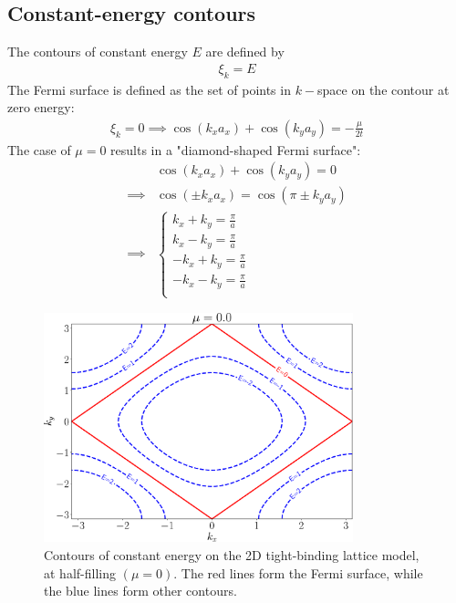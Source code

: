 \documentclass[12pt]{article}
\numberwithin{equation}{section}
\begin{document}
\subsection*{Constant-energy contours}
The contours of constant energy \(E\) are defined by
\begin{equation}\begin{aligned}
	\xi_k = E
\end{aligned}\end{equation}
The Fermi surface is defined as the set of points in $k-$space on the contour at zero energy:
\begin{equation}\begin{aligned}
	\xi_k = 0 \implies \cos(k_x a_x) + \cos(k_y a_y) = -\frac{\mu}{2t}
\end{aligned}\end{equation}
The case of \(\mu=0\) results in a "diamond-shaped Fermi surface":
\begin{equation}\begin{aligned}
	&\cos(k_x a_x) + \cos(k_y a_y) = 0\\
	\implies &\cos(\pm k_x a_x) = \cos(\pi \pm k_y a_y) \\
	\implies & \begin{cases}
		k_x + k_y = \frac{\pi}{a}\\
		k_x - k_y = \frac{\pi}{a}\\
		-k_x + k_y = \frac{\pi}{a}\\
		-k_x - k_y = \frac{\pi}{a}\\
	\end{cases}
\end{aligned}\end{equation}
\begin{figure}[htpb]
	\centering
	\includegraphics[width=0.8\textwidth]{./contours.pdf}
	\caption{Contours of constant energy on the 2D tight-binding lattice model, at half-filling \((\mu = 0)\). The red lines form the Fermi surface, while the blue lines form other contours.}
\end{figure}
\end{document}
